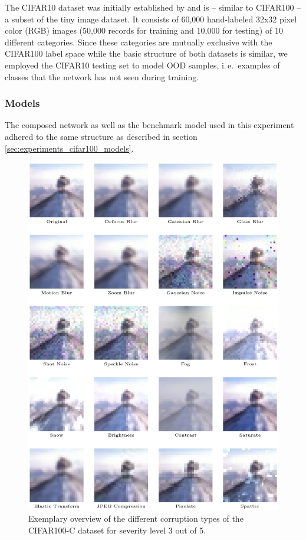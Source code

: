 The CIFAR10 dataset was initially established by \cite{Krizhevsky2009-wt} and is -- similar to CIFAR100 -- a subset of the tiny image dataset. It consists of 60,000 hand-labeled 32x32 pixel color (RGB) images (50,000 records for training and 10,000 for testing) of 10 different categories. Since these categories are mutually exclusive with the CIFAR100 label space while the basic structure of both datasets is similar, we employed the CIFAR10 testing set to model OOD samples, i.\,e.\ examples of classes that the network has not seen during training.

\subsubsection{Models%
               \label{sec:experiments_uncertainty_models}}
               
The composed network as well as the benchmark model used in this experiment adhered to the same structure as described in section \ref{sec:experiments_cifar100_models}.

\pagebreak

\begin{figure}[htb]
    \centering
	    \includegraphics[width=\textwidth]{thesis/graphics/images/cifar100_c_sample_images.jpg}
    \caption{Exemplary overview of the different corruption types of the CIFAR100-C dataset for severity level 3 out of 5.}
    \label{fig:experiments_uncertainty_sample_images}
\end{figure}

